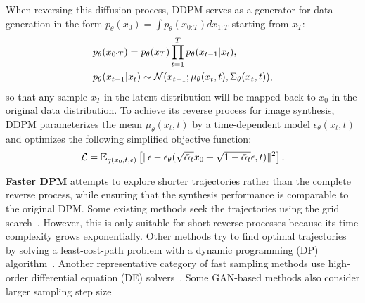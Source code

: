 When reversing this diffusion process, DDPM serves as a generator for data generation in the form $p_{\theta}(x_0) = \int p_{\theta}(x_{0:T})dx_{1:T}$ starting from $x_T$:
%
\begin{align}
& p_{\theta}(x_{0:T})=p_{\theta}(x_T)\prod_{t=1}^T p_{\theta}(x_{t-1}|x_t),\\
& p_{\theta}(x_{t-1}|x_t)\sim\mathcal N(x_{t-1};\mu_{\theta}(x_t,t),\Sigma_{\theta}(x_t,t))\textcolor{black}{,}
\end{align}
so that any sample $x_T$ in the latent distribution will be mapped back to $x_0$ in the original data distribution. 
To achieve its reverse process for image synthesis, DDPM parameterizes the mean $\mu_{\theta}(x_t,t)$ by a time-dependent model $\epsilon_{\theta}(x_t,t)$ and optimizes the following simplified objective function:
%
%
%
%
\begin{align}
\mathcal{L} = \mathbb{E}_{q(x_0, t, \epsilon)}\left[\|\epsilon - \epsilon_{\theta}(\sqrt{\bar{\alpha}_{t}}x_0 + \sqrt{1 - \bar{\alpha}_{t}}\epsilon, t)\|^2 \right].
\end{align}



\noindent\textbf{Faster DPM} attempts to explore shorter trajectories rather than the complete reverse process, while ensuring that the synthesis performance is comparable to the original DPM.
%
Some existing methods seek the trajectories using the grid search~\cite{chen2020wavegrad}.
%
However, this is only suitable for short reverse processes because its time complexity grows exponentially.
%
Other methods try to find optimal trajectories by solving a least-cost-path problem with a dynamic programming (DP) algorithm~\cite{watson2021learning,bao2022analyticdpm}.
%
Another representative category of fast sampling methods use high-order differential equation (DE) solvers~\cite{jolicoeur2021gotta,Liu0LZ22,PopovVGSKW22,tachibana2021taylor,lu2022dpm}.
%
Some GAN-based methods also consider larger sampling step size \cite{xiao2022DDGAN} 

